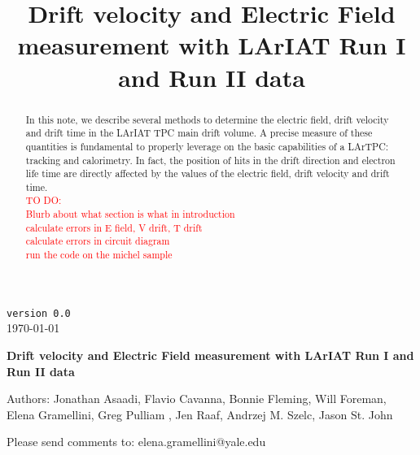 \documentclass[a4paper]{article}
\title{Drift velocity and Electric Field measurement with LArIAT Run I and Run II data}
\begin{document}
\def\Journal#1#2#3#4{{#1} {\bf #2}, #3 (#4)}
\def\etal{{\it et\ al.}}
\def\numunue{\nu_\mu\rightarrow\nu_e}
\def\numunutau{\nu_\mu\rightarrow\nu_\tau}
\def\nuebar{\bar\nu_e}
\def\nue{\nu_e}
\def\nutau{\nu_\tau}
\def\numubar{\bar\nu_\mu}
\def\numu{\nu_\mu}
\def\ra{\rightarrow}
\def\numubarnuebar{\bar\nu_\mu\rightarrow\bar\nu_e}
\def\nuebarnumubar{\bar\nu_e\rightarrow\bar\nu_\mu}
\def\osc{\rightsquigarrow}
\def\inteni{{\cal I}_{pot}}
\def\fmerit{{\cal F}}
\begin{flushright}
{\tt version 0.0}\\ 
\today
\end{flushright}
\vspace*{0.6cm}
\linenumbers
\begin{center}
{\Large \bf Drift velocity and Electric Field measurement with LArIAT Run I and Run II data} 
\vspace*{1.6cm}
\setcounter{footnote}{0}  
\def\A{\kern+.6ex\lower.42ex\hbox{$\scriptstyle \iota$}\kern-1.20ex a}
\def\E{\kern+.5ex\lower.42ex\hbox{$\scriptstyle \iota$}\kern-1.10ex e}
\small
\newcommand{\Aname}[2]{#1}
\def\titlefoot#1{\vspace{-0.3cm}\begin{center}{\bf #1}\end{center}}

Authors: Jonathan Asaadi, Flavio Cavanna, Bonnie Fleming, Will Foreman, Elena Gramellini,  Greg Pulliam , Jen Raaf, Andrzej M. Szelc,   Jason St. John\\

\end{center}
\vspace*{1cm}

\noindent Please send comments to: elena.gramellini@yale.edu


\begin{abstract}
In this note, we describe several methods to determine the electric field, drift velocity and drift time in the LArIAT TPC main drift volume. 
A precise measure of these quantities is fundamental to properly leverage on the basic capabilities of a LArTPC: tracking and calorimetry. In fact, the position of hits in the drift direction and electron life time are directly affected by the values of the electric field, drift velocity and drift time.\\
\textcolor{red}{TO DO:\\
Blurb about what section is what in introduction\\
calculate errors in E field, V drift, T drift\\
calculate errors in circuit diagram\\
run the code on the michel sample\\}
\end{abstract} 
\end{document}
